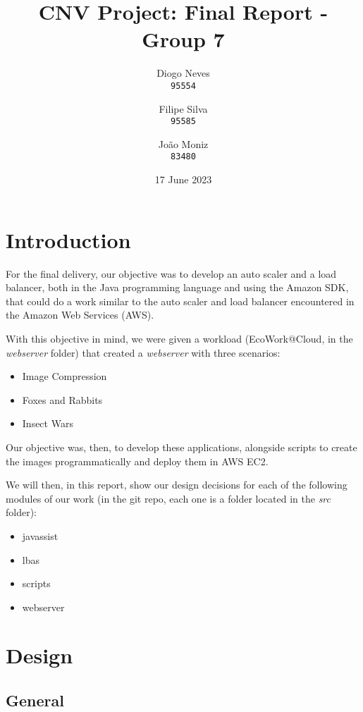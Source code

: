 \documentclass{article}
\date{17 June 2023}
\title{CNV Project: Final Report - Group 7}
\author{
    Diogo Neves \\
    \texttt{95554}
    \and
    Filipe Silva \\
    \texttt{95585}
    \and
    João Moniz \\
    \texttt{83480}
}
\begin{document}
\setcounter{page}{0}

\maketitle

\twocolumn

\section{Introduction}

For the final delivery, our objective was to develop an auto scaler and a load
balancer, both in the Java programming language and using the Amazon SDK, that
could do a work similar to the auto scaler and load balancer encountered in the
Amazon Web Services (AWS).

With this objective in mind, we were given a workload (EcoWork@Cloud, in the
\textit{webserver} folder) that created a \textit{webserver} with three scenarios:

\begin{itemize}
    \item Image Compression
    \item Foxes and Rabbits
    \item Insect Wars
\end{itemize}

Our objective was, then, to develop these applications, alongside scripts to
create the images programmatically and deploy them in AWS EC2.

We will then, in this report, show our design decisions for each of the
following modules of our work (in the git repo, each one is a folder located in
the \textit{src} folder):

\begin{itemize}
    \item javassist
    \item lbas
    \item scripts
    \item webserver
\end{itemize}

\section{Design}

\subsection{General}
\end{document}
